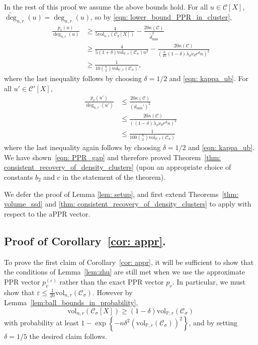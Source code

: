 \documentclass[11pt,twoside]{article}
\theoremstyle{definition}
\newcommand{\set}[1]{\left\{#1\right\}}
\newcommand{\vol}{\mathrm{vol}}
\newcommand{\1}{\mathbbm{1}}
\newcommand{\Xbf}{X}
\newcommand{\Pbb}{\mathbb{P}}
\newcommand{\Cset}{\mathcal{C}}
\newcommand{\Csig}{\Cset_{\sigma}}
\begin{document}
In the rest of this proof we assume the above bounds hold. For all $u \in \Cset[\Xbf]$, $\widetilde{\deg}_{n,r}(u) = \deg_{n,r}(u)$, so by \eqref{eqn: lower_bound_PPR_in_cluster},
\begin{align*}
\frac{p_v(u)}{\deg_{n,r}(u)} & \geq \frac{4}{5 \vol_{n,r}(\Csig[\Xbf])} - \frac{20 \kappa(\Cset)}{\widetilde{d}_{\min}^2} \\
& \geq \frac{4}{5(1+\delta)\vol_{\Pbb,r}(\Csig)n^2} - \frac{20\kappa(\Cset)}{\left(\frac{6}{25}(1 - \delta)\lambda_{\sigma}\nu_dr^dn\right)^2} \\
& \geq \frac{1}{10{n \choose 2}\vol_{\Pbb,r}(\Csig)},
\end{align*}
where the last inequality follows by choosing $\delta = 1/2$ and \eqref{eqn: kappa_ub}. For all $u' \in \Cset'[\Xbf]$, 
\begin{align}
\frac{p_v(u')}{\deg_{n,r}(u')} & \leq \frac{20\kappa(\Cset)}{(d_{\min}')^2} \nonumber \\
& \leq \frac{20\kappa(\Cset)}{\left((1 - \delta)\lambda_{\sigma}\nu_dr^dn\right)^2} \nonumber \\
& \leq \frac{1}{100{n \choose 2}\vol_{\Pbb,r}(\Csig)} \label{eqn:consistent_recovery_of_density_clusters_pf1}
\end{align}
where the last inequality again follows by choosing $\delta = 1/2$ and \eqref{eqn: kappa_ub}. We have shown~\eqref{eqn: PPR_gap} and therefore proved Theorem~\ref{thm: consistent_recovery_of_density_clusters} (upon an appropriate choice of constants $b_2$ and $c$ in the statement of the theorem).


We defer the proof of Lemma \ref{lem: setup}, and first extend Theorems~\ref{thm: volume_ssd} and \ref{thm: consistent_recovery_of_density_clusters} to apply with respect to the aPPR vector.

\subsection{Proof of Corollary~\ref{cor: appr}.}
\label{sec:appr}
To prove the first claim of Corollary~\ref{cor: appr}, it will be sufficient to show that the conditions of Lemma~\ref{lem:zhu} are still met when we use the approximate PPR vector $p^{(\varepsilon)}_v$ rather than the exact PPR vector $p_v$. In particular, we must show that $\varepsilon \leq \frac{1}{20}\vol_{n,r}(\Csig)$. However by Lemma~\ref{lem:ball_bounds_in_probability},
\begin{equation}
\label{eqn:appr_pf1}
\vol_{n,r}(\Csig[\Xbf]) \geq (1 - \delta)\vol_{\Pbb,r}(\Csig)
\end{equation}
with probability at least $1 - \exp\set{-n \delta^2 (\vol_{\Pbb,r}(\Csig))^2}$, and by setting $\delta = 1/5$ the desired claim follows.
\end{document}
